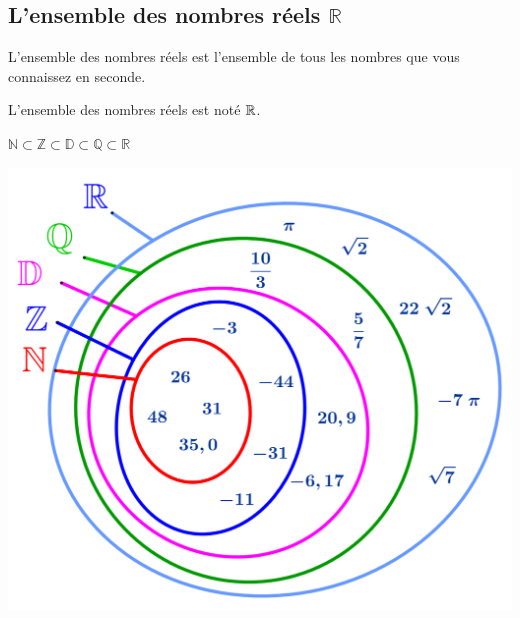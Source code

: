 \begin{pageCours} %



\section{L'ensemble des nombres réels $\mathbb{R}$}

\begin{Def}
L'ensemble des nombres réels est l'ensemble de tous les nombres que vous connaissez en seconde.

L'ensemble des nombres réels est noté $\mathbb R$.
\end{Def}

\begin{Rq}
$\mathbb{N}\subset\mathbb{Z}\subset\mathbb{D}\subset\mathbb{Q}\subset\mathbb{R}$
\end{Rq}

\begin{center}
\includegraphics[width=.4\linewidth]{FIG/ensemble_de_nmbres.png} 
\end{center}

\end{pageCours} %


\begin{pageAD}  %
\restoregeometry %



\end{pageAD} %


